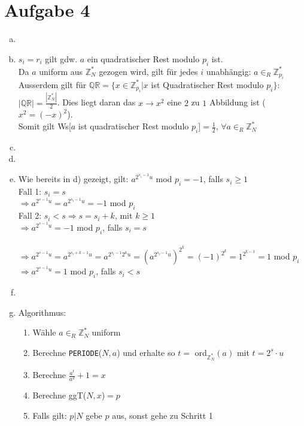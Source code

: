 \documentclass[a4paper]{scrartcl}
\begin{document}
\section*{Aufgabe 4}
\begin{enumerate}[a)]
\item

\item $s_i = r_i$ gilt gdw. $a$ ein quadratischer Rest modulo $p_i$ ist.\\
 Da $a$ uniform aus $\mathbb{Z}_N^*$ gezogen wird, gilt für jedes $i$ unabhängig: $a\in_R\mathbb{Z}_{p_i}^*$\\
Ausserdem gilt für $\mathbb{QR}=\{x\in \mathbb{Z}_{p_i}^*|x$ ist Quadratischer Rest modulo $p_i\}$: $|\mathbb{QR}|=\frac{|\mathbb{Z}_N^*|}{2}$. Dies liegt daran das $x \rightarrow x^2$ eine $2$ zu $1$ Abbildung ist ($x^2=(-x)^2$).\\
Somit gilt Ws[$a$ ist quadratischer Rest modulo $p_i$]$=\frac{1}{2}$, $\forall a\in_R\mathbb{Z}_N^*$

\item

\item

\item Wie bereits in d) gezeigt, gilt: $a^{2^{s_i-1}u}$ mod $ p_i=-1$, falls $s_i\geq 1$\\
Fall 1: $s_i=s$\\
$\Rightarrow a^{2^{s-1}u} = a^{2^{s_i-1}u}=-1$ mod $p_i$\\
Fall 2: $s_i < s \Rightarrow s = s_i+k$, mit $k\geq 1$\\
$\Rightarrow a^{2^{s-1}u} = -1$ mod $p_i$, falls $s_i=s$\\\\
$\Rightarrow a^{2^{s-1}u} = a^{2^{s_i+k-1}u}=a^{2^{s_i-1}2^ku} = (a^{2^{s_i-1}u})^{2^k} = (-1)^{2^k} = 1^{2^{k-1}}= 1$ mod $p_i$\\
$\Rightarrow a^{2^{s-1}u} = 1$ mod $p_i$, falls $s_i<s$
\item

\item
Algorithmus:\\
\begin{enumerate}[1.]
\item Wähle $a\in_R \mathbb{Z}_N^*$ uniform
\item Berechne \texttt{PERIODE}($N,a$) und erhalte so $t =$ ord$_{\mathbb{Z}_N^*}(a)$ mit $t=2^s\cdot u$
\item Berechne $\frac{a^t}{a^2}+1=x$
\item Berechne ggT($N, x$)$=p$
\item Falls gilt: $p | N$ gebe $p$ aus, sonst gehe zu Schritt 1
\end{enumerate}


\end{enumerate}
\end{document}
